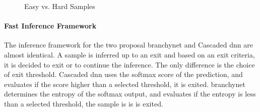 \begin{figure}
	\captionsetup[subfigure]{justification=centering}
	\centering
	\caption[Easy vs. Hard Samples]{Easy vs. Hard Samples}
	\label{fig:hardvseasydog}
\end{figure}

\paragraph{Fast Inference Framework} The inference framework for the two proposal \gls{branchynet} and Cascaded \gls{dnn} are almost identical. A sample is inferred up to an exit and based on an exit criteria, it is decided to exit or to continue the inference. The only difference is the choice of exit threshold. Cascaded \gls{dnn} uses the softmax score of the prediction, and evaluates if the score higher than a selected threshold, it is exited. \gls{branchynet} determines the entropy of the softmax output, and evaluates if the entropy is less than a selected threshold, the sample is is is exited.

